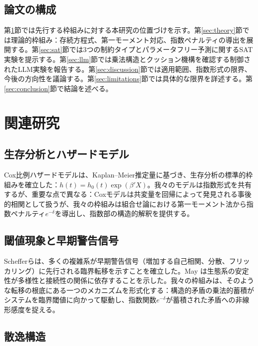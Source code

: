 \documentclass[11pt,a4paper]{article}
\begin{document}
\subsection{論文の構成}

第\ref{sec:related}節では先行する枠組みに対する本研究の位置づけを示す。第\ref{sec:theory}節では理論的枠組み：存続方程式、第一モーメント対応、指数ペナルティの導出を展開する。第\ref{sec:sat}節では3つの制約タイプとパラメータフリー予測に関するSAT実験を提示する。第\ref{sec:llm}節では乗法構造とクッション機構を確認する制御されたLLM実験を報告する。第\ref{sec:discussion}節では適用範囲、指数形式の限界、今後の方向性を議論する。第\ref{sec:limitations}節では具体的な限界を詳述する。第\ref{sec:conclusion}節で結論を述べる。

\section{関連研究}
\label{sec:related}

\subsection{生存分析とハザードモデル}

Cox比例ハザードモデル\cite{cox1972}は、Kaplan--Meier推定量\cite{kaplan1958}に基づき、生存分析の標準的枠組みを確立した：$h(t) = h_0(t) \exp(\beta' X)$。我々のモデルは指数形式を共有するが、重要な点で異なる：Coxモデルは共変量を回帰によって発見される事後的相関として扱うが、我々の枠組みは組合せ論における第一モーメント法から指数ペナルティ$e^{-\delta}$を導出し、指数部の構造的解釈を提供する。

\subsection{閾値現象と早期警告信号}

Schefferら\cite{scheffer2009}は、多くの複雑系が早期警告信号（増加する自己相関、分散、フリッカリング）に先行される臨界転移を示すことを確立した。May \cite{may1972}は生態系の安定性が多様性と接続性の関係に依存することを示した。我々の枠組みは、そのような転移の根底にある一つのメカニズムを形式化する：構造的矛盾の乗法的蓄積がシステムを臨界閾値に向かって駆動し、指数関数$e^{-\delta}$が蓄積された矛盾への非線形感度を捉える。

\subsection{散逸構造}
\end{document}
